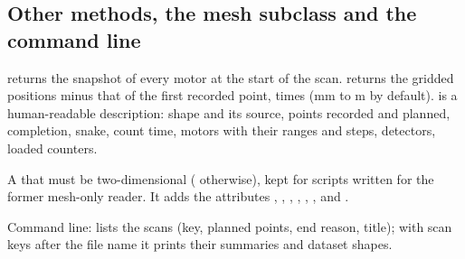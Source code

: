 \subsection{Other methods, the mesh subclass and the command line}

 returns the snapshot of every motor at the start of the scan.
 returns the gridded positions minus that of the first
recorded point, times  (mm to \textmu m by default).  is a
human-readable description: shape and its source, points recorded and planned, completion,
snake, count time, motors with their ranges and steps, detectors, loaded counters.

A  that must be two-dimensional ( otherwise), kept for scripts
written for the former mesh-only reader. It adds the attributes ,
, , , , ,  and
.

Command line:  lists the scans (key, planned
points, end reason, title); with scan keys after the file name it prints their summaries and
dataset shapes.
